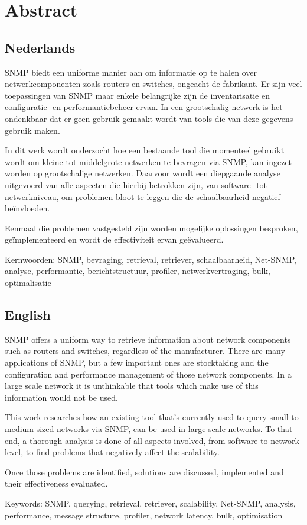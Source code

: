 \chapter*{Abstract}

\section*{Nederlands}

SNMP biedt een uniforme manier aan om informatie op te halen over netwerkcomponenten zoals routers en switches, ongeacht de fabrikant.
Er zijn veel toepassingen van SNMP maar enkele belangrijke zijn de inventarisatie en configuratie- en performantiebeheer ervan.
In een grootschalig netwerk is het ondenkbaar dat er geen gebruik gemaakt wordt van tools die van deze gegevens gebruik maken.

In dit werk wordt onderzocht hoe een bestaande tool die momenteel gebruikt wordt om kleine tot middelgrote netwerken te bevragen via SNMP,
kan ingezet worden op grootschalige netwerken.
Daarvoor wordt een diepgaande analyse uitgevoerd van alle aspecten die hierbij betrokken zijn,
van software- tot netwerkniveau, om problemen bloot te leggen die de schaalbaarheid negatief beïnvloeden.

Eenmaal die problemen vastgesteld zijn worden mogelijke oplossingen besproken, geïmplementeerd en wordt de effectiviteit ervan geëvalueerd.


Kernwoorden: SNMP, bevraging, retrieval, retriever, schaalbaarheid, Net-SNMP, analyse, performantie, berichtstructuur, profiler, netwerkvertraging, bulk, optimalisatie


\section*{English}

SNMP offers a uniform way to retrieve information about network components such as routers and switches, regardless of the manufacturer.
There are many applications of SNMP, but a few important ones are stocktaking and the configuration and performance management of those network components.
In a large scale network it is unthinkable that tools which make use of this information would not be used.

This work researches how an existing tool that's currently used to query small to medium sized networks via SNMP,
can be used in large scale networks.
To that end, a thorough analysis is done of all aspects involved, from software to network level, to find problems that negatively affect the scalability.

Once those problems are identified, solutions are discussed, implemented and their effectiveness evaluated.


Keywords: SNMP, querying, retrieval, retriever, scalability, Net-SNMP, analysis, performance, message structure, profiler, network latency, bulk, optimisation